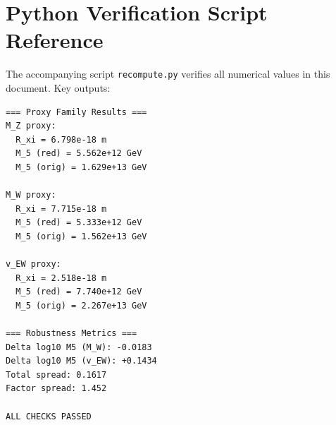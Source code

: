 \documentclass[11pt,a4paper]{article}
\theoremstyle{definition}
\theoremstyle{plain}
\theoremstyle{remark}
\begin{document}
\section{Python Verification Script Reference}
\label{app:python}

The accompanying script \texttt{recompute.py} verifies all numerical values in this document.
Key outputs:

\begin{verbatim}
=== Proxy Family Results ===
M_Z proxy:
  R_xi = 6.798e-18 m
  M_5 (red) = 5.562e+12 GeV
  M_5 (orig) = 1.629e+13 GeV

M_W proxy:
  R_xi = 7.715e-18 m
  M_5 (red) = 5.333e+12 GeV
  M_5 (orig) = 1.562e+13 GeV

v_EW proxy:
  R_xi = 2.518e-18 m
  M_5 (red) = 7.740e+12 GeV
  M_5 (orig) = 2.267e+13 GeV

=== Robustness Metrics ===
Delta log10 M5 (M_W): -0.0183
Delta log10 M5 (v_EW): +0.1434
Total spread: 0.1617
Factor spread: 1.452

ALL CHECKS PASSED
\end{verbatim}

\end{document}
